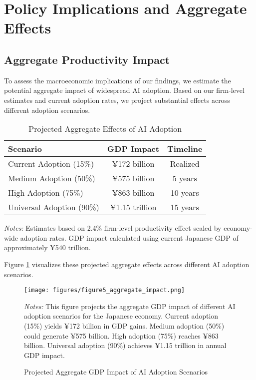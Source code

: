 \documentclass[12pt, a4paper]{article}
\begin{document}
\section{Policy Implications and Aggregate Effects}

\subsection{Aggregate Productivity Impact}

To assess the macroeconomic implications of our findings, we estimate the potential aggregate impact of widespread AI adoption. Based on our firm-level estimates and current adoption rates, we project substantial effects across different adoption scenarios.

\begin{table}[H]
\centering
\caption{Projected Aggregate Effects of AI Adoption}
\label{tab:aggregate}
\begin{tabular}{lcc}
\toprule
Scenario & GDP Impact & Timeline \\
\midrule
Current Adoption (15\%) & ¥172 billion & Realized \\
Medium Adoption (50\%) & ¥575 billion & 5 years \\
High Adoption (75\%) & ¥863 billion & 10 years \\
Universal Adoption (90\%) & ¥1.15 trillion & 15 years \\
\bottomrule
\end{tabular}
\begin{minipage}{\textwidth}
\footnotesize
\textit{Notes:} Estimates based on 2.4\% firm-level productivity effect scaled by economy-wide adoption rates. GDP impact calculated using current Japanese GDP of approximately ¥540 trillion.
\end{minipage}
\end{table}

Figure \ref{fig:aggregate_impact} visualizes these projected aggregate effects across different AI adoption scenarios.

\begin{figure}[H]
\centering
\texttt{[image: figures/figure5\_aggregate\_impact.png]}
\caption{Projected Aggregate GDP Impact of AI Adoption Scenarios}
\label{fig:aggregate_impact}
\begin{minipage}{\textwidth}
\footnotesize
\textit{Notes:} This figure projects the aggregate GDP impact of different AI adoption scenarios for the Japanese economy. Current adoption (15\%) yields ¥172 billion in GDP gains. Medium adoption (50\%) could generate ¥575 billion. High adoption (75\%) reaches ¥863 billion. Universal adoption (90\%) achieves ¥1.15 trillion in annual GDP impact.
\end{minipage}
\end{figure}
\end{document}
